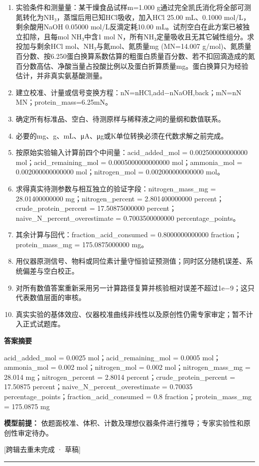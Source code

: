 \documentclass[UTF8,11pt,a4paper]{ctexart}
\begin{document}
\begin{enumerate}
\item 实验条件和测量量：某干燥食品试样m=1.000 g通过完全凯氏消化将全部可测氮转化为NH₃，蒸馏后用已知HCl吸收，加入HCl 25.00 mL、0.1000 mol/L，剩余酸用NaOH 0.05000 mol/L反滴定耗10.00 mL。试剂空白在此方案已被独立扣除，且每mol NH₃中含1 mol N，所有NH₃定量吸收且无其它碱性组分。求投加与剩余HCl mol、NH₃与氮mol、氮质量mg (MN=14.007 g/mol)、氮质量百分数、按6.250蛋白换算系数估算的粗蛋白质量百分数、若不扣回滴造成的氮百分数高估、净酸当量占投酸比例以及蛋白折算质量mg。蛋白换算只为经验估计，并非真实氨基酸测量。
\item 建立校准、计量或信号变换方程：nN=nHCl,add−nNaOH,back；mN=nN MN；protein\_mass=6.25mN。
\item 确定所有标准品、空白、待测原样与稀释液之间的量纲和数值联系。
\item 必要的mg、g、mL、μA、μg或K单位转换必须在代数求解之前完成。
\item 按原始实验输入计算前四个中间量：acid\_added\_mol = 0.002500000000000 mol；acid\_remaining\_mol = 0.0005000000000000 mol；ammonia\_mol = 0.002000000000000 mol；nitrogen\_mol = 0.002000000000000 mol。
\item 求得真实待测参数与相互独立的验证字段：nitrogen\_mass\_mg = 28.01400000000 mg；nitrogen\_percent = 2.801400000000 percent；crude\_protein\_percent = 17.50875000000 percent；naive\_N\_percent\_overestimate = 0.7003500000000 percentage\_points。
\item 其余计算与回代：fraction\_acid\_consumed = 0.8000000000000 fraction；protein\_mass\_mg = 175.0875000000 mg。
\item 用仪器原测信号、物料或同位素计量守恒验证预测值；同时区分随机误差、系统偏差与空白校正。
\item 对所有数值答案重新采用另一计算路径复算并核验相对误差不超过1e−9；这只代表数值层面的审核。
\item 真实实验的基体效应、仪器校准曲线非线性以及原创性仍需专家审定；暂不计入正式试题库。
\end{enumerate}
\noindent\textbf{答案摘要}\par
acid\_added\_mol = 0.0025 mol；acid\_remaining\_mol = 0.0005 mol；ammonia\_mol = 0.002 mol；nitrogen\_mol = 0.002 mol；nitrogen\_mass\_mg = 28.014 mg；nitrogen\_percent = 2.8014 percent；crude\_protein\_percent = 17.50875 percent；naive\_N\_percent\_overestimate = 0.70035 percentage\_points；fraction\_acid\_consumed = 0.8 fraction；protein\_mass\_mg = 175.0875 mg\par
\noindent\textbf{模型前提：}
依题面校准、体积、计数及理想仪器条件进行推导；专家实验性和原创性审定待办。\par
\noindent\textcolor{red!65!black}{[跨辑去重未完成 · 草稿]} \par
\medskip\hrule\medskip
{}
\end{document}
